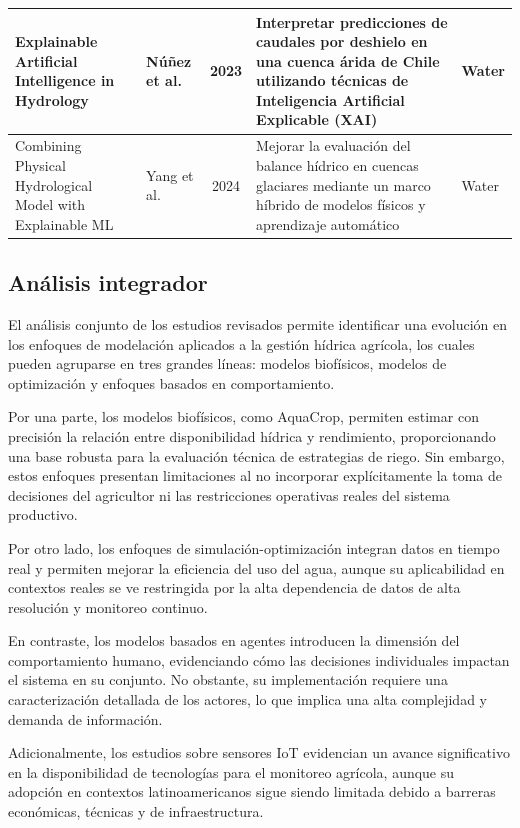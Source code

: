 \documentclass[12pt]{report}
\begin{document}
\begin{longtable}{p{2.8cm} p{2.8cm} c p{4cm} p{3cm}}
Explainable Artificial Intelligence in Hydrology & Núñez et al. & 2023 & Interpretar predicciones de caudales por deshielo en una cuenca árida de Chile utilizando técnicas de Inteligencia Artificial Explicable (XAI) & Water \\ \hline

Combining Physical Hydrological Model with Explainable ML & Yang et al. & 2024 & Mejorar la evaluación del balance hídrico en cuencas glaciares mediante un marco híbrido de modelos físicos y aprendizaje automático & Water \\ \hline
\end{longtable}



\subsection{Análisis integrador}

El análisis conjunto de los estudios revisados permite identificar una evolución en los enfoques de modelación aplicados a la gestión hídrica agrícola, los cuales pueden agruparse en tres grandes líneas: modelos biofísicos, modelos de optimización y enfoques basados en comportamiento.

Por una parte, los modelos biofísicos, como AquaCrop, permiten estimar con precisión la relación entre disponibilidad hídrica y rendimiento, proporcionando una base robusta para la evaluación técnica de estrategias de riego. Sin embargo, estos enfoques presentan limitaciones al no incorporar explícitamente la toma de decisiones del agricultor ni las restricciones operativas reales del sistema productivo.

Por otro lado, los enfoques de simulación-optimización integran datos en tiempo real y permiten mejorar la eficiencia del uso del agua, aunque su aplicabilidad en contextos reales se ve restringida por la alta dependencia de datos de alta resolución y monitoreo continuo.

En contraste, los modelos basados en agentes introducen la dimensión del comportamiento humano, evidenciando cómo las decisiones individuales impactan el sistema en su conjunto. No obstante, su implementación requiere una caracterización detallada de los actores, lo que implica una alta complejidad y demanda de información.

Adicionalmente, los estudios sobre sensores IoT evidencian un avance significativo en la disponibilidad de tecnologías para el monitoreo agrícola, aunque su adopción en contextos latinoamericanos sigue siendo limitada debido a barreras económicas, técnicas y de infraestructura.
\end{document}
